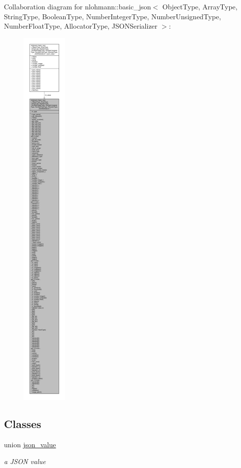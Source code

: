 Collaboration diagram for nlohmann\+:\+:basic\+\_\+json$<$ Object\+Type, Array\+Type, String\+Type, Boolean\+Type, Number\+Integer\+Type, Number\+Unsigned\+Type, Number\+Float\+Type, Allocator\+Type, J\+S\+O\+N\+Serializer $>$\+:\nopagebreak
\begin{figure}[H]
\begin{center}
\leavevmode
\includegraphics[height=550pt]{classnlohmann_1_1basic__json__coll__graph}
\end{center}
\end{figure}
\subsection*{Classes}
\begin{DoxyCompactItemize}
\item 
union \hyperlink{unionnlohmann_1_1basic__json_1_1json__value}{json\+\_\+value}
\begin{DoxyCompactList}\small\item\em a J\+S\+ON value \end{DoxyCompactList}\end{DoxyCompactItemize}
